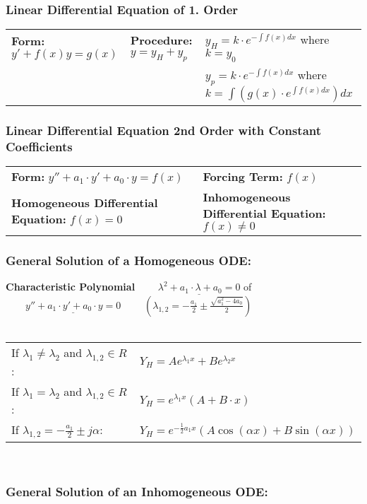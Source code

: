 
	\subsubsection{Linear Differential Equation of 1. Order}
	\begin{tabular}{lll}
	\textbf{Form:} $ y'+f(x)y = g(x) $ &
	\textbf{Procedure:} $y=y_H+y_p$ &
	$y_H=k \cdot e^{-\int f(x) dx}$ where $k=y_0$\\ & &
	$y_p=k \cdot e^{-\int f(x) dx}$ where $k=\int(g(x) \cdot e^{\int f(x) dx}) dx$
	\end{tabular}

	\subsubsection{Linear Differential Equation 2nd Order with Constant Coefficients}
	\begin{tabular}{p{8cm}p{8cm}}
	\textbf{Form:} $y''+a_1\cdot y'+a_0\cdot y=f(x)$  &
	\textbf{Forcing Term:} $f(x)$\\
	\textbf{Homogeneous Differential Equation:} $f(x)=0$ &
	\textbf{Inhomogeneous Differential Equation:} $f(x)\neq 0$
	\end{tabular}

	\subsubsection{General Solution of a Homogeneous ODE:\quad\subsubadd{$\quad
	Y_H$}}
	\textbf{Characteristic Polynomial}
	$\qquad\underline{\lambda^2+a_1\cdot\lambda+a_0=0}$ \hspace{1cm}of
	$\qquad\underline{y''+a_1\cdot y'+a_0\cdot y=0}$
	$\qquad(\lambda_{1,2} = -\frac{a_1}{2} \pm \frac{\sqrt{a_1^2 - 4a_0}}{2})$\\ \\
	\begin{tabular}{p{8cm}p{8cm}}
	If $\lambda_1\neq \lambda_2$ and $\lambda_{1,2} \in R$:&
	$Y_H=Ae^{\lambda_1x}+Be^{\lambda_2x}$\\
	If $\lambda_1=\lambda_2$ and $\lambda_{1,2} \in R$:    &
	$Y_H=e^{\lambda_1x}(A+B\cdot x)$\\
	If $\lambda_{1,2}=-\frac{a_1}{2}\pm j\alpha$:          &
	$Y_H=e^{-\frac{1}{2}a_1x}(A\cos(\alpha x) +B\sin(\alpha x))$\\
	\end{tabular}\\

	\subsubsection{General Solution of an Inhomogeneous ODE:\quad{}}

